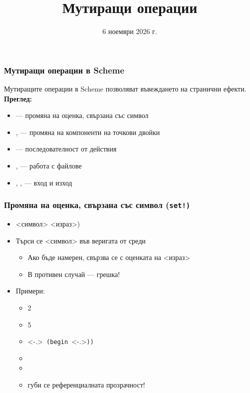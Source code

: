 \documentclass[alsotrans,beameroptions={aspectratio=169}]{beamerswitch}
\title{Мутиращи операции}
\date{6 ноември 2026 г.}
\begin{document}
\begin{frame}
  \titlepage
\end{frame}

\begin{frame}
  \frametitle{Мутиращи операции в Scheme}

  Мутиращите операции в Scheme позволяват въвеждането на \alert{странични ефекти}.\\[4ex]
  \pause
  \textbf{Преглед:}
  \begin{itemize}[<+->]
  \item {} --- промяна на оценка, свързана със символ
  \item {},  --- промяна на компоненти на точкови двойки
  \item {} --- последователност от действия
  \item {},  --- работа с файлове
  \item {}, ,  --- вход и изход
  \end{itemize}
\end{frame}

\begin{frame}[fragile]
  \frametitle{Промяна на оценка, свързана със символ (\tt{set!})}

  \begin{itemize}[<+->]
  \item {} <символ> <израз>\tta)
  \item Търси се <символ> във веригата от среди
    \begin{itemize}
    \item Ако бъде намерен, свързва се с оценката на <израз>
    \item В противен случай --- \alert{грешка!}
    \end{itemize}
  \item Примери:
    \begin{itemize}
    \item {}\hspace{3em}2
    \item {}\hspace{4em}5
    \item {}\only<-.>{\tt{ (begin }}\only<-.>{\tt)}\tt)\pause
    \item {}
    \item {}
    \item \alert{губи се референциалната прозрачност!}
    \end{itemize}
  \end{itemize}
\end{frame}
\end{document}
